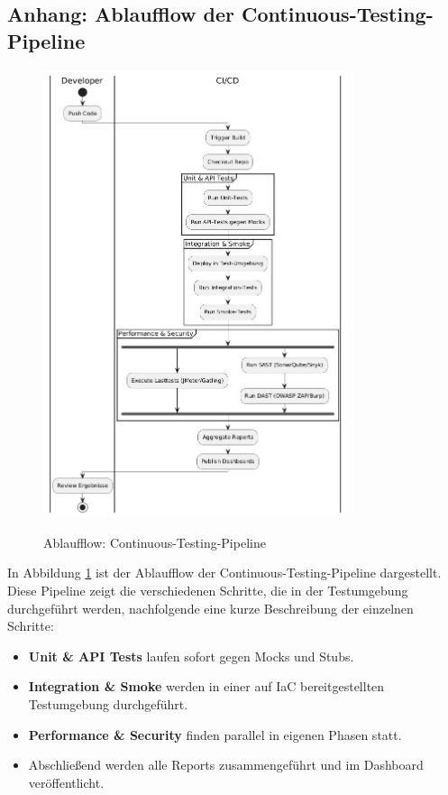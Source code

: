 \subsection{Anhang: Ablaufflow der Continuous-Testing-Pipeline}
\begin{figure}[h!]
\centering
\caption{Ablaufflow: Continuous-Testing-Pipeline}
    \includegraphics[width=0.8\textwidth]{fig/ablauf_pipeline.png}
    \label{fig:flow}
\end{figure} 
In Abbildung \ref{fig:flow} ist der Ablaufflow der Continuous-Testing-Pipeline dargestellt. Diese Pipeline zeigt die verschiedenen Schritte, die in der Testumgebung durchgeführt werden, nachfolgende eine kurze Beschreibung der einzelnen Schritte:
\begin{itemize}
    \item \textbf{Unit \& API Tests} laufen sofort gegen Mocks und Stubs.
    \item \textbf{Integration \& Smoke} werden in einer auf IaC bereitgestellten Testumgebung durchgeführt.
    \item \textbf{Performance \& Security} finden parallel in eigenen Phasen statt.
    \item Abschließend werden alle Reports zusammengeführt und im Dashboard veröffentlicht.
\end{itemize}
